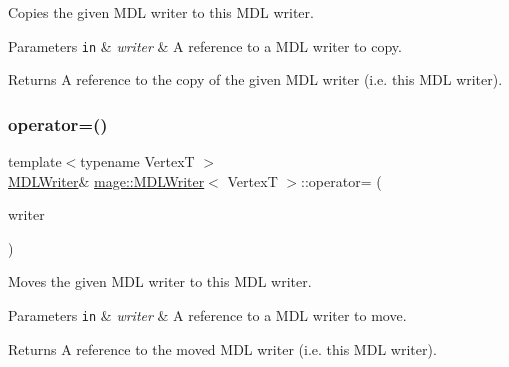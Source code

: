 Copies the given M\+DL writer to this M\+DL writer.


\begin{DoxyParams}[1]{Parameters}
\mbox{\tt in}  & {\em writer} & A reference to a M\+DL writer to copy. \\
\hline
\end{DoxyParams}
\begin{DoxyReturn}{Returns}
A reference to the copy of the given M\+DL writer (i.\+e. this M\+DL writer). 
\end{DoxyReturn}
\hypertarget{classmage_1_1_m_d_l_writer_ac5c21784110691e24d84d6c241a2e5f6}{}\label{classmage_1_1_m_d_l_writer_ac5c21784110691e24d84d6c241a2e5f6} 
\subsubsection{\texorpdfstring{operator=()}{operator=()}\hspace{0.1cm}{\footnotesize\ttfamily [2/2]}}
{\footnotesize\ttfamily template$<$typename VertexT $>$ \\
\hyperlink{classmage_1_1_m_d_l_writer}{M\+D\+L\+Writer}\& \hyperlink{classmage_1_1_m_d_l_writer}{mage\+::\+M\+D\+L\+Writer}$<$ VertexT $>$\+::operator= (\begin{DoxyParamCaption}\item[{\hyperlink{classmage_1_1_m_d_l_writer}{M\+D\+L\+Writer}$<$ VertexT $>$ \&\&}]{writer }\end{DoxyParamCaption})\hspace{0.3cm}{\ttfamily [delete]}}

Moves the given M\+DL writer to this M\+DL writer.


\begin{DoxyParams}[1]{Parameters}
\mbox{\tt in}  & {\em writer} & A reference to a M\+DL writer to move. \\
\hline
\end{DoxyParams}
\begin{DoxyReturn}{Returns}
A reference to the moved M\+DL writer (i.\+e. this M\+DL writer). 
\end{DoxyReturn}
\hypertarget{classmage_1_1_m_d_l_writer_aa326a70b449baae2d7db8043e2731327}{}\label{classmage_1_1_m_d_l_writer_aa326a70b449baae2d7db8043e2731327} 

